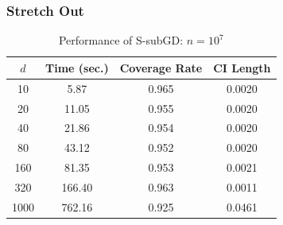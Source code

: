 \documentclass[beamer, t]{beamer}
\begin{document}
\begin{frame}
\frametitle{Stretch Out}
	\begin{table}[htb]
		\centering
		\caption{Performance of S-subGD: $n=10^7$} 
		\label{tb_SGD_rs}
		\begin{tabular}{cccc
			}
			\hline
			{$d$} & {Time (sec.)} & {Coverage Rate} & {CI Length} \\ 
			\hline
			10 & 5.87 & 0.965 & 0.0020 \\ 
			20 & 11.05 & 0.955 & 0.0020 \\ 
			40 & 21.86 & 0.954 & 0.0020 \\ 
			80 & 43.12 & 0.952 & 0.0020 \\ 
			160 & 81.35 & 0.953 & 0.0021 \\ 
			320 & 166.40 & 0.963 & 0.0011 \\ 
			1000 & 762.16 & 0.925 & 0.0461 \\ 
			\hline
		\end{tabular}
	\end{table}
	
	
\end{frame}
\end{document}
